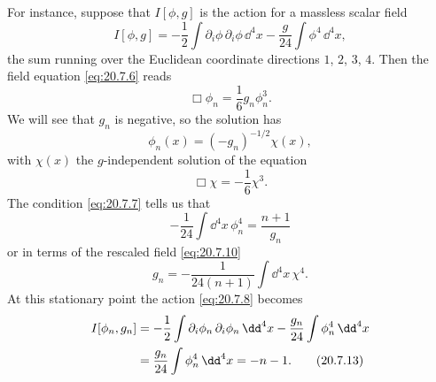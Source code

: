 For instance, suppose that $I[\phi,g]$ is the action for a massless scalar field
\begin{equation}
I[\phi,g]
=-\frac12\int \partial_i\phi\,\partial_i\phi\,\dd^4x
-\frac{g}{24}\int\phi^4\,\dd^4x,
\tag{20.7.8}\label{eq:20.7.8}
\end{equation}
the sum running over the Euclidean coordinate directions $1$, $2$, $3$, $4$. Then the field equation \eqref{eq:20.7.6} reads
\begin{equation}
\Box\phi_n=\frac16g_n\phi_n^3.
\tag{20.7.9}\label{eq:20.7.9}
\end{equation}
We will see that $g_n$ is negative, so the solution has
\begin{equation}
\phi_n(x)=(-g_n)^{-1/2}\chi(x),
\tag{20.7.10}\label{eq:20.7.10}
\end{equation}
with $\chi(x)$ the $g$-independent solution of the equation
\begin{equation}
\Box\chi=-\frac16\chi^3.
\tag{20.7.11}\label{eq:20.7.11}
\end{equation}
The condition \eqref{eq:20.7.7} tells us that
\[
-\frac1{24}\int \dd^4x\,\phi_n^4=\frac{n+1}{g_n}
\]
or in terms of the rescaled field \eqref{eq:20.7.10}
\begin{equation}
g_n=-\frac{1}{24(n+1)}\int \dd^4x\,\chi^4.
\tag{20.7.12}\label{eq:20.7.12}
\end{equation}
At this stationary point the action \eqref{eq:20.7.8} becomes
\begin{align}
I[\phi_n,g_n]
&=-\frac12\int\partial_i\phi_n\,\partial_i\phi_n\,\dd^4x
-\frac{g_n}{24}\int\phi_n^4\,\dd^4x
\notag\\
&=\frac{g_n}{24}\int\phi_n^4\,\dd^4x
=-n-1.
\tag{20.7.13}\label{eq:20.7.13}
\end{align}

